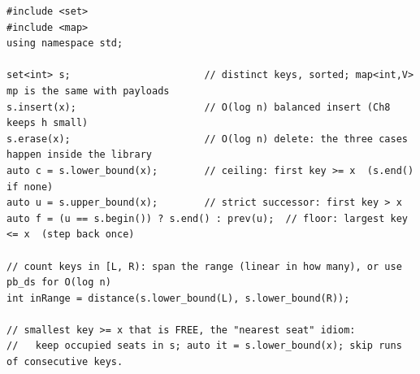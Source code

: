 \begin{lstlisting}[caption={The set/map navigation kit -- each line is a chapter-7 descent by name}, label={lst:c05-setkit}]
#include <set>
#include <map>
using namespace std;

set<int> s;                       // distinct keys, sorted; map<int,V> mp is the same with payloads
s.insert(x);                      // O(log n) balanced insert (Ch8 keeps h small)
s.erase(x);                       // O(log n) delete: the three cases happen inside the library
auto c = s.lower_bound(x);        // ceiling: first key >= x  (s.end() if none)
auto u = s.upper_bound(x);        // strict successor: first key > x
auto f = (u == s.begin()) ? s.end() : prev(u);  // floor: largest key <= x  (step back once)

// count keys in [L, R): span the range (linear in how many), or use pb_ds for O(log n)
int inRange = distance(s.lower_bound(L), s.lower_bound(R));

// smallest key >= x that is FREE, the "nearest seat" idiom:
//   keep occupied seats in s; auto it = s.lower_bound(x); skip runs of consecutive keys.
\end{lstlisting}

